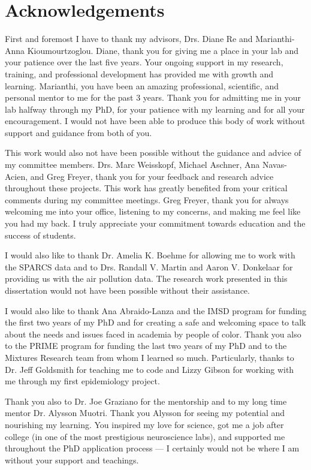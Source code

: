 \chapter{Acknowledgements}

First and foremost I have to thank my advisors, Drs. Diane Re and Marianthi-Anna Kioumourtzoglou. Diane, thank you for giving me a place in your lab and your patience over the last five years. Your ongoing support in my research, training, and professional development has provided me with growth and learning. Marianthi, you have been an amazing professional, scientific, and personal mentor to me for the past 3 years. Thank you for admitting me in your lab halfway through my PhD, for your patience with my learning and for all your encouragement. I would not have been able to produce this body of work without support and guidance from both of you.

This work would also not have been possible without the guidance and advice of my committee members. Drs. Marc Weisskopf, Michael Aschner, Ana Navas-Acien, and Greg Freyer, thank you for your feedback and research advice throughout these projects. This work has greatly benefited from your critical comments during my committee meetings. Greg Freyer, thank you for always welcoming me into your office, listening to my concerns, and making me feel like you had my back. I truly appreciate your commitment towards education and the success of students. 

I would also like to thank Dr. Amelia K. Boehme for allowing me to work with the SPARCS data and to Drs. Randall V. Martin and Aaron V. Donkelaar for providing us with the air pollution data. The research work presented in this dissertation would not have been possible without their assistance. 

I would also like to thank Ana Abraido-Lanza and the IMSD program for funding the first two years of my PhD and for creating a safe and welcoming space to talk about the needs and issues faced in academia by people of color. Thank you also to the PRIME program for funding the last two years of my PhD and to the Mixtures Research team from whom I learned so much. Particularly, thanks to Dr. Jeff Goldsmith for teaching me to code and Lizzy Gibson for working with me through my first epidemiology project. 

Thank you also to Dr. Joe Graziano for the mentorship and to my long time mentor Dr. Alysson Muotri. Thank you Alysson for seeing my potential and nourishing my learning. You inspired my love for science, got me a job after college (in one of the most prestigious neuroscience labs), and supported me throughout the PhD application process --- I certainly would not be where I am without your support and teachings.   


